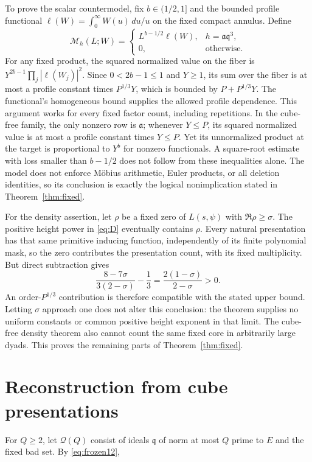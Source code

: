 \documentclass[11pt]{article}
\theoremstyle{remark}\newtheorem{remark}[theorem]{Remark}
\begin{document}
To prove the scalar countermodel, fix $b\in(1/2,1]$ and the bounded profile functional $\ell(W)=\int_0^\infty W(u)\,du/u$ on the fixed compact annulus. Define
\[
\mathcal M_h(L;W)=
\begin{cases}
L^{b-1/2}\ell(W),&h=\mathfrak a\mathfrak q^3,\\
0,&\text{otherwise}.
\end{cases}
\]
For any fixed product, the squared normalized value on the fiber is $Y^{2b-1}\prod_j|\ell(W_j)|^2$. Since $0<2b-1\le1$ and $Y\ge1$, its sum over the fiber is at most a profile constant times $P^{1/3}Y$, which is bounded by $P+P^{1/3}Y$. The functional's homogeneous bound supplies the allowed profile dependence. This argument works for every fixed factor count, including repetitions. In the cube-free family, the only nonzero row is $\mathfrak a$; whenever $Y\le P$, its squared normalized value is at most a profile constant times $Y\le P$. Yet its unnormalized product at the target is proportional to $Y^b$ for nonzero functionals. A square-root estimate with loss smaller than $b-1/2$ does not follow from these inequalities alone. The model does not enforce Möbius arithmetic, Euler products, or all deletion identities, so its conclusion is exactly the logical nonimplication stated in Theorem~\ref{thm:fixed}.

For the density assertion, let $\rho$ be a fixed zero of $L(s,\psi)$ with $\Re\rho\ge\sigma$. The positive height power in \eqref{eq:D} eventually contains $\rho$. Every natural presentation has that same primitive inducing function, independently of its finite polynomial mask, so the zero contributes the presentation count, with its fixed multiplicity. But direct subtraction gives
\[
\frac{8-7\sigma}{3(2-\sigma)}-\frac13
=\frac{2(1-\sigma)}{2-\sigma}>0.
\]
An order-$P^{1/3}$ contribution is therefore compatible with the stated upper bound. Letting $\sigma$ approach one does not alter this conclusion: the theorem supplies no uniform constants or common positive height exponent in that limit. The cube-free density theorem also cannot count the same fixed core in arbitrarily large dyads. This proves the remaining parts of Theorem~\ref{thm:fixed}.
\section{Reconstruction from cube presentations}\label{sec:reconstruction}

For \(Q\ge2\), let \(\mathcal Q(Q)\) consist of ideals \(\mathfrak q\) of norm at most \(Q\) prime to \(E\) and the fixed bad set. By \eqref{eq:frozen12},
\end{document}
